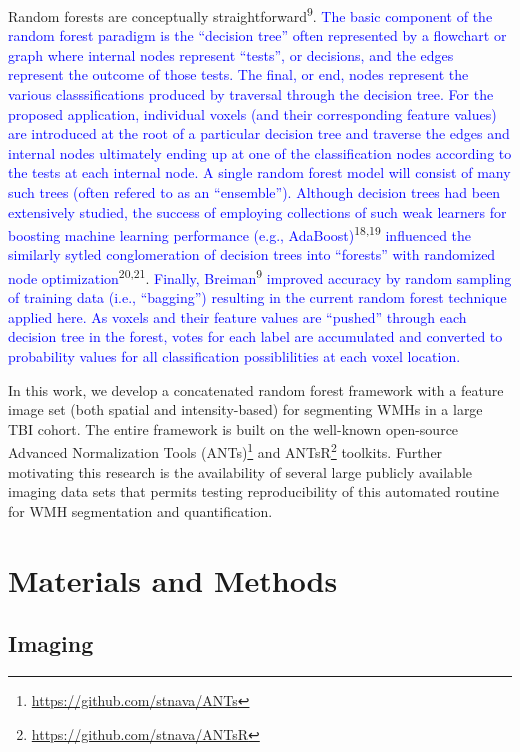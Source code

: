 \documentclass[11pt,]{article}
\let\rmarkdownfootnote\footnote%
\def\footnote{\protect\rmarkdownfootnote}
\begin{document}
Random forests are conceptually straightforward\textsuperscript{9}.
\textcolor{blue}{The basic component of
the random forest paradigm is the ``decision tree'' often represented by a flowchart or
graph where internal nodes represent ``tests'', or decisions, and the edges represent the outcome of those tests.  The final, or end, nodes represent the various classsifications produced by traversal through the decision tree.  For the proposed application, individual
voxels (and their corresponding feature values) are introduced at the root of a particular
decision tree and traverse the edges and internal nodes ultimately ending up at one of
the classification nodes according to the tests at each internal node.  A single random
forest model will consist of many such trees (often refered to as an ``ensemble'').}
\textcolor{blue}{Although decision trees had been extensively studied, the success of employing collections of such weak learners for boosting machine learning performance
(e.g., AdaBoost)}\textsuperscript{18,19}
\textcolor{blue}{influenced the similarly sytled conglomeration of decision trees into ``forests'' with randomized node optimization}\textsuperscript{20,21}.
\textcolor{blue}{Finally, Breiman}\textsuperscript{9}
\textcolor{blue}{improved accuracy by random sampling of training data (i.e., ``bagging'') resulting
in the current random forest technique applied here.}
\textcolor{blue}{As voxels and their feature values are ``pushed'' through each decision tree in the forest,  votes for each label are accumulated and converted to probability values for all classification possiblilities at
each voxel location.}

In this work, we develop a concatenated random forest framework with a
feature image set (both spatial and intensity-based) for segmenting WMHs
in a large TBI cohort. The entire framework is built on the well-known
open-source Advanced Normalization Tools (ANTs)\footnote{\url{https://github.com/stnava/ANTs}}
and ANTsR\footnote{\url{https://github.com/stnava/ANTsR}} toolkits.
Further motivating this research is the availability of several large
publicly available imaging data sets that permits testing
reproducibility of this automated routine for WMH segmentation and
quantification.

\section{Materials and Methods}\label{materials-and-methods}

\subsection{Imaging}\label{imaging}
\end{document}
